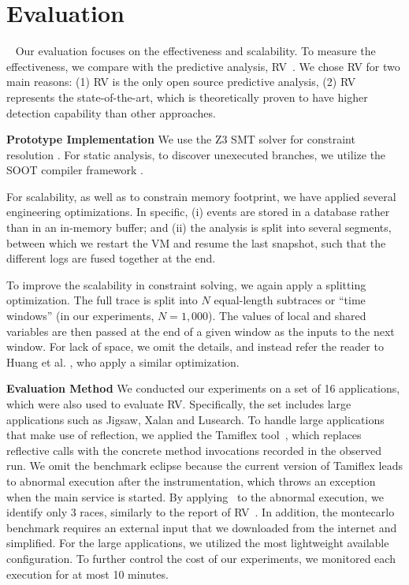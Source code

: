 \section{Evaluation}~\label{sec:eval}
Our evaluation focuses on the effectiveness  and scalability.
To measure the effectiveness, we compare with the predictive analysis, 
{\sf RV}~\cite{pldi14}. We chose RV for two main reasons: (1) {\sf RV} is the 
only open source predictive analysis, (2) {\sf RV} represents the 
state-of-the-art, which is theoretically proven to have higher detection 
capability than other approaches. 

{\bf Prototype Implementation}  We use the Z3 SMT solver for constraint 
resolution \cite{MouraB08}. For static analysis, to discover unexecuted 
branches, we utilize the SOOT compiler framework \cite{Vallee-RaiCGHLS99}.

For scalability, as well as to constrain memory footprint, we have 
applied several engineering optimizations. In specific, (i) events are 
stored in a database rather than in an in-memory buffer; and (ii) the 
analysis is split into several segments, between which we restart 
the VM and resume the last snapshot, such that the different logs 
are fused together at the end. 


To improve the scalability in constraint solving, we again apply 
a splitting optimization. The full trace is split into $N$ equal-length 
subtraces or ``time windows'' (in our experiments, $N=1,000$). The values 
of local and shared variables are then passed at the end of a 
given window as the inputs to the next window. For lack of space, we 
omit the details, and instead refer the reader to 
Huang et al. \cite{pldi14}, who apply a similar optimization.


{\bf Evaluation Method} We conducted our experiments on a set of 16 
applications, which were also used to evaluate {\sf RV}. Specifically, 
the set includes large applications such as {\sf Jigsaw}, 
{\sf Xalan} and {\sf Lusearch}. To handle large applications that make 
use of reflection, we applied the {\sf Tamiflex} tool~\cite{tamiflex}, which 
replaces reflective calls with the concrete method invocations recorded 
in the observed run.
We omit the benchmark {\sf eclipse} because the current version 
of {\sf Tamiflex}  leads to abnormal execution after the instrumentation, 
which throws an exception when the main service is started. 
By applying \tool\  to the abnormal execution, we identify only 3 races, 
similarly to the report of RV~\cite{pldi14}.
In addition, the {\sf montecarlo} benchmark requires an external input 
that we downloaded from the internet and simplified. For the large 
applications, we utilized the most lightweight available configuration.
To further control the cost of our experiments, we monitored each execution for at most 10 minutes.


